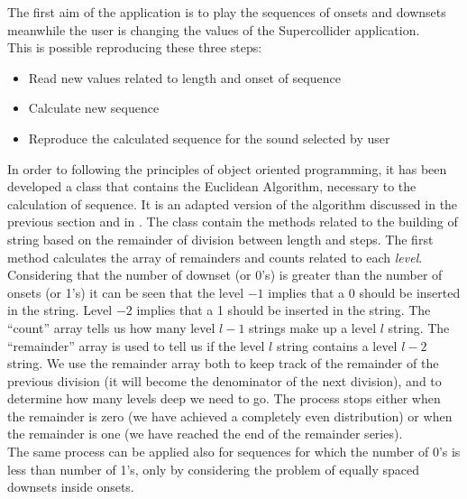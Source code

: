 \documentclass[main.tex]{subfiles}
\begin{document}
The first aim of the application is to play the sequences of onsets and downsets meanwhile the user is changing the values of the Supercollider application.\\
This is possible reproducing these three steps:
\begin{itemize}[noitemsep]
\item Read new values related to length and onset of sequence
\item Calculate new sequence
\item Reproduce the calculated sequence for the sound selected by user
\end{itemize}
In order to following the principles of object oriented programming, it has been developed a class that contains the Euclidean Algorithm, necessary to the calculation of sequence. It is an adapted version of the algorithm discussed in the previous section and in \cite{Bjorklund:2003:euclidean:rhythm}. The class contain the methods related to the building of string based on the remainder of division between length and steps. The first method calculates the array of remainders and counts related to each \textit{level}. Considering that the number of downset (or 0's) is greater than the number of onsets (or 1's) it can be seen that the level \begin{math}-1\end{math} implies that a 0 should be inserted in
the string. Level \begin{math}-2\end{math} implies that a 1 should be inserted in the string. The “count”
array tells us how many level \begin{math}l-1\end{math} strings make up a level \begin{math}l\end{math} string. The “remainder” array is used to tell us if the level \begin{math}l\end{math} string contains a level \begin{math}l-2\end{math} string. We use the remainder array both to keep track of the remainder of the previous division (it will become the denominator of the next
division), and to determine how many levels deep we need to go. The process stops
either when the remainder is zero (we have achieved a completely even distribution) or
when the remainder is one (we have reached the end of the remainder series).\\
The same process can be applied also for sequences for which the number of 0's is less than number of 1's, only by considering the problem of equally spaced downsets inside onsets.
\end{document}
